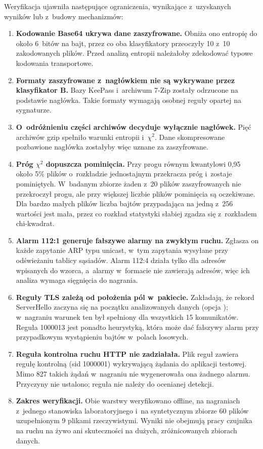 Weryfikacja ujawniła następujące ograniczenia, wynikające z~uzyskanych wyników lub z~budowy mechanizmów:
\begin{enumerate}
  \item \textbf{Kodowanie Base64 ukrywa dane zaszyfrowane.} Obniża ono entropię do około 6~bitów na bajt, przez co oba klasyfikatory przeoczyły 10 z~10 zakodowanych plików. Przed analizą entropii należałoby zdekodować typowe kodowania transportowe.
  \item \textbf{Formaty zaszyfrowane z~nagłówkiem nie są wykrywane przez klasyfikator B.} Bazy KeePass i~archiwum 7-Zip zostały odrzucone na podstawie nagłówka. Takie formaty wymagają osobnej reguły opartej na sygnaturze.
  \item \textbf{O~odróżnieniu części archiwów decyduje wyłącznie nagłówek.} Pięć archiwów gzip spełniło warunki entropii i~$\chi^2$. Dane skompresowane pozbawione nagłówka zostałyby więc uznane za zaszyfrowane.
  \item \textbf{Próg $\chi^2$ dopuszcza pominięcia.} Przy progu równym kwantylowi 0,95 około 5\% plików o~rozkładzie jednostajnym przekracza próg i~zostaje pominiętych. W~badanym zbiorze żaden z~20 plików zaszyfrowanych nie przekroczył progu, ale przy większej liczbie plików pominięcia są oczekiwane. Dla bardzo małych plików liczba bajtów przypadająca na jedną z~256 wartości jest mała, przez co rozkład statystyki słabiej zgadza się z~rozkładem chi-kwadrat.
  \item \textbf{Alarm 112:1 generuje fałszywe alarmy na zwykłym ruchu.} Zgłasza on każde zapytanie ARP typu unicast, w~tym zapytania wysyłane przy odświeżaniu tablicy sąsiadów. Alarm 112:4 działa tylko dla adresów wpisanych do wzorca, a~alarmy w~formacie  nie zawierają adresów, więc ich analiza wymaga sięgnięcia do nagrania.
  \item \textbf{Reguły TLS zależą od położenia pól w~pakiecie.} Zakładają, że rekord ServerHello zaczyna się na początku analizowanych danych (opcja ); w~nagraniu warunek ten był spełniony dla wszystkich 15 komunikatów. Reguła 1000013 jest ponadto heurystyką, która może dać fałszywy alarm przy przypadkowym wystąpieniu bajtów  w~polach losowych.
  \item \textbf{Reguła kontrolna ruchu HTTP nie zadziałała.} Plik reguł zawiera regułę kontrolną (sid 1000001) wykrywającą żądania  do aplikacji testowej. Mimo 827 takich żądań w~nagraniu nie wygenerowała ona żadnego alarmu. Przyczyny nie ustalono; reguła nie należy do ocenianej detekcji.
  \item \textbf{Zakres weryfikacji.} Obie warstwy weryfikowano offline, na nagraniach z~jednego stanowiska laboratoryjnego i~na syntetycznym zbiorze 60 plików uzupełnionym 9 plikami rzeczywistymi. Wyniki nie obejmują pracy czujnika na ruchu na żywo ani skuteczności na dużych, zróżnicowanych zbiorach danych.
\end{enumerate}
